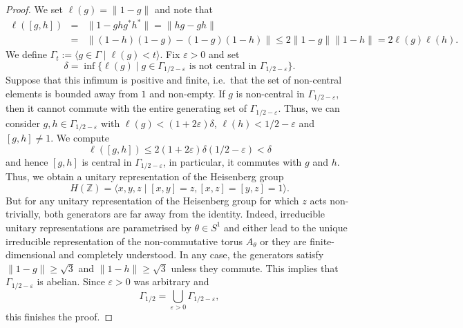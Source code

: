\documentclass[10pt,a4paper]{amsart}
\begin{document}
\begin{proof}
We set $\ell(g)=\|1-g\|$ and note that
\begin{eqnarray*} \ell([g,h]) &=& \|1-ghg^*h^*\| = \|hg-gh\| \\
&=& \|(1-h)(1-g)-(1-g)(1-h)\| \leq 2 \|1-g\|\|1-h\| = 2 \ell(g) \ell(h).
\end{eqnarray*}
We define $\Gamma_{t} := \langle g \in \Gamma \mid \ell(g)<t \rangle$. 
Fix $\varepsilon>0$ and set
$$\delta = \inf\{\ell(g) \mid g \in \Gamma_{1/2-\varepsilon} \mbox{ is not central in } \Gamma_{1/2-\varepsilon}\}.$$
Suppose that this infimum is positive and finite, i.e.\ that the set of non-central elements is bounded away from $1$ and non-empty. If $g$ is non-central in $\Gamma_{1/2-\varepsilon}$, then it cannot commute with the entire generating set of $\Gamma_{1/2-\varepsilon}$. Thus, we can consider $g,h \in \Gamma_{1/2-\varepsilon}$ with $\ell(g) < (1+2\varepsilon)\delta$, $\ell(h)<1/2 - \varepsilon$ and $[g,h] \neq 1$. We compute $$\ell([g,h]) \leq 2 (1+2\varepsilon)\delta (1/2-\varepsilon)<\delta$$ and hence $[g,h]$ is central in $\Gamma_{1/2-\varepsilon}$, in particular, it commutes with $g$ and $h$. Thus, we obtain a unitary representation of the Heisenberg group
$$H(\mathbb Z) = \langle x,y,z \mid [x,y]=z, [x,z]=[y,z]=1 \rangle.$$ But for any unitary representation of the Heisenberg group for which $z$ acts non-trivially, both generators are far away from the identity. Indeed, irreducible unitary representations are parametrised by $\theta \in S^1$ and either lead to the unique irreducible representation of the non-commutative torus $A_{\theta}$ or they are finite-dimensional and completely understood. In any case, the generators satisfy $\|1-g\| \geq \sqrt{3}$ and $\|1-h\| \geq \sqrt{3}$ unless they commute. This implies that $\Gamma_{1/2-\varepsilon}$ is abelian. Since $\varepsilon>0$ was arbitrary and $$\Gamma_{1/2} = \bigcup_{\varepsilon>0} \Gamma_{1/2-\varepsilon},$$
this finishes the proof.
\end{proof}
\end{document}
